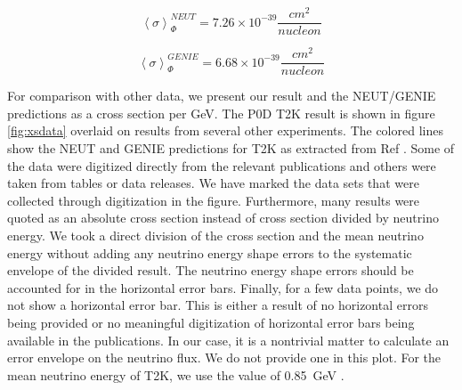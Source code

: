 \begin{equation}
\left<\sigma\right>_\Phi^{NEUT} = 7.26 \times 10^{-39} \frac{cm^2}{nucleon}
\end{equation}

\begin{equation}
\left<\sigma\right>_\Phi^{GENIE} = 6.68 \times 10^{-39} \frac{cm^2}{nucleon}
\end{equation}

For comparison with other data, we present our result and the NEUT/GENIE predictions as a cross section per GeV. The P0D T2K result is shown in figure \ref{fig:xsdata} overlaid on results from several other experiments. The colored lines show the NEUT and GENIE predictions for T2K as extracted from Ref \cite{ccinc}. Some of the data were digitized directly from the relevant publications and others were taken from tables or data releases. We have marked the data sets that were collected through digitization in the figure. Furthermore, many results were quoted as an absolute cross section instead of cross section divided by neutrino energy. We took a direct division of the cross section and the mean neutrino energy without adding any neutrino energy shape errors to the systematic envelope of the divided result. The neutrino energy shape errors should be accounted for in the horizontal error bars. Finally, for a few data points, we do not show a horizontal error bar. This is either a result of no horizontal errors being provided or no meaningful digitization of horizontal error bars being available in the publications. In our case, it is a nontrivial matter to calculate an error envelope on the neutrino flux. We do not provide one in this plot. For the mean neutrino energy of T2K, we use the value of 0.85~GeV \cite{ccinc}.

